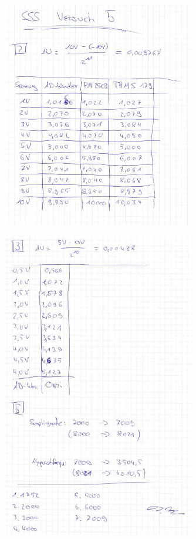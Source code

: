 \documentclass[12pt, oneside, a4paper, \docLanguage]{report}
\begin{document}
\begin{figure}[H]
	\centering\small
	\includegraphics[width=0.75\textwidth]{media/Messwerte1.png}
\end{figure}

\begin{figure}[H]
	\centering\small
	\includegraphics[width=0.75\textwidth]{media/Messwerte2.png}
\end{figure}
\end{document}
